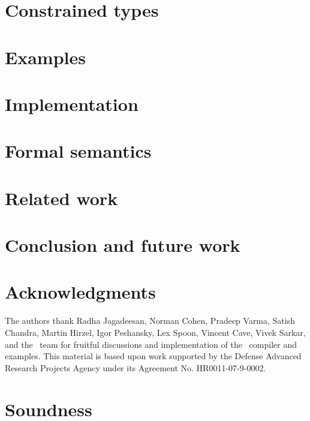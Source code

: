 \documentclass[10pt]{sigplanconf}
\begin{document}
\section{Constrained types}\label{sec:lang}

\label{method-sec}


\section{Examples}\label{sec:examples}


\section{Implementation}\label{sec:implementation}
\label{sec:impl}


\section{Formal semantics}
\label{sec:semantics}


\section{Related work}\label{sec:related}


\section{Conclusion and future work}\label{sec:future}\label{sec:conclusions}
%

\fi

\section*{Acknowledgments}

The authors thank Radha Jagadeesan,
Norman Cohen, Pra\-deep Varma,
Satish Chandra, Martin Hirzel, Igor Peshansky,
Lex Spoon, Vincent Cave, Vivek Sarkar,
and the \Xten\ team for fruitful discussions and implementation of
the \Xten\ compiler and examples.
This material is based upon work supported by the Defense
Advanced Research Projects Agency under its Agreement No.
HR0011-07-9-0002.





\appendix

\section{Soundness}
\label{sec:proof}



% 
\end{document}
